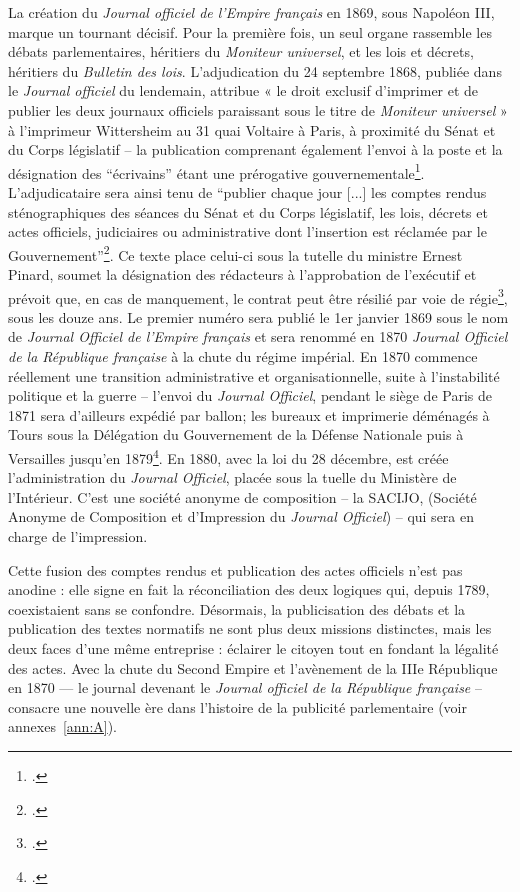 La création du \emph{Journal officiel de l’Empire français} en 1869, sous Napoléon III, marque un tournant décisif. Pour la première fois, un seul organe rassemble les débats parlementaires, héritiers du \emph{Moniteur universel}, et les lois et décrets, héritiers du \emph{Bulletin des lois}. L’adjudication du 24 septembre 1868, publiée dans le \emph{Journal officiel} du lendemain, attribue « le droit exclusif d’imprimer et de publier les deux journaux officiels paraissant sous le titre de \emph{Moniteur universel} » à l’imprimeur Wittersheim au 31 quai Voltaire à Paris, à proximité du Sénat et du Corps législatif -- la publication comprenant également l'envoi à la poste et la désignation des \enquote{écrivains} étant une prérogative gouvernementale\footcite[][]{cote1}. L'adjudicataire sera ainsi tenu de \enquote{publier chaque jour [...] les comptes rendus sténographiques des séances du Sénat et du Corps législatif, les lois, décrets et actes officiels, judiciaires ou administrative dont l'insertion est réclamée par le Gouvernement}\footcite[][]{cote1}. Ce texte place celui-ci sous la tutelle du ministre Ernest Pinard, soumet la désignation des rédacteurs à l’approbation de l’exécutif et prévoit que, en cas de manquement, le contrat peut être résilié par voie de régie\footcite[][]{cote1}, sous les douze ans. Le premier numéro sera publié le 1er janvier 1869 sous le nom de \emph{Journal Officiel de l'Empire français} et sera renommé en 1870 \emph{Journal Officiel de la République française} à la chute du régime impérial. En 1870 commence réellement une transition administrative et organisationnelle, suite à l'instabilité politique et la guerre -- l'envoi du \emph{Journal Officiel}, pendant le siège de Paris de 1871 sera d'ailleurs expédié par ballon; les bureaux et imprimerie déménagés à Tours sous la Délégation du Gouvernement de la Défense Nationale puis à Versailles jusqu'en 1879\footcite[][]{cote1}. En 1880, avec la loi du 28 décembre, est créée l'administration du \emph{Journal Officiel}, placée sous la tuelle du Ministère de l'Intérieur. C'est une société anonyme de composition -- la SACIJO, (Société Anonyme de Composition et d'Impression du \emph{Journal Officiel}) -- qui sera en charge de l'impression.

Cette fusion des comptes rendus et publication des actes officiels n’est pas anodine : elle signe en fait la réconciliation des deux logiques qui, depuis 1789, coexistaient sans se confondre. Désormais, la publicisation des débats et la publication des textes normatifs ne sont plus deux missions distinctes, mais les deux faces d’une même entreprise : éclairer le citoyen tout en fondant la légalité des actes. Avec la chute du Second Empire et l’avènement de la IIIe République en 1870 --- le journal devenant le \emph{Journal officiel de la République française} -- consacre une nouvelle ère dans l’histoire de la publicité parlementaire (voir annexes~\ref{ann:A}). 

